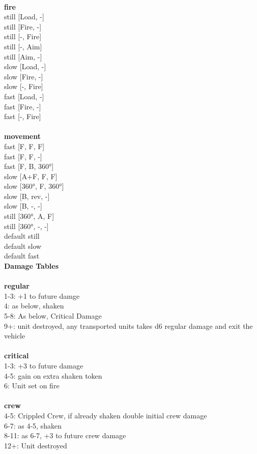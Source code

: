 \ \\ {\bf fire } \\
still [Load, -] \\
still [Fire, -] \\
still [-, Fire] \\
still [-, Aim] \\
still [Aim, -] \\
slow [Load, -] \\
slow [Fire, -] \\
slow [-, Fire] \\
fast [Load, -] \\
fast [Fire, -] \\
fast [-, Fire] \\
\ \\ {\bf movement } \\
fast [F, F, F] \\
fast [F, F, -] \\
fast [F, B, 360°] \\
slow [A+F, F, F] \\
slow [360°, F, 360°] \\
slow [B, rev, -] \\
slow [B, -, -] \\
still [360°, A, F] \\
still [360°, -, -] \\
default still \\
default slow \\
default fast \\


{\bf Damage Tables} \\
\ \\ {\bf regular } \\
1-3: +1 to future damge \\
4: as below, shaken \\
5-8: As below, Critical Damage \\
9+: unit destroyed, any transported units takes d6 regular damage and exit the vehicle \\
\ \\ {\bf critical } \\
1-3: +3 to future damage \\
4-5: gain on extra shaken token \\
6: Unit set on fire \\
\ \\ {\bf crew } \\
4-5: Crippled Crew, if already shaken double initial crew damage \\
6-7: as 4-5, shaken \\
8-11: as 6-7, +3 to future crew damage \\
12+: Unit destroyed \\



